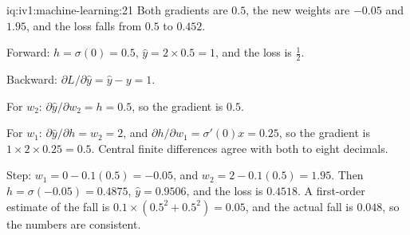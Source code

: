 \begin{solution}{iq:iv1:machine-learning:21}
Both gradients are $0.5$, the new weights are $-0.05$ and $1.95$, and the loss falls from $0.5$ to $0.452$.

Forward: $h = \sigma(0) = 0.5$, $\hat{y} = 2 \times 0.5 = 1$, and the loss is $\frac12$.

Backward: $\partial L/\partial\hat{y} = \hat{y} - y = 1$.

For $w_2$: $\partial\hat{y}/\partial w_2 = h = 0.5$, so the gradient is $0.5$.

For $w_1$: $\partial\hat{y}/\partial h = w_2 = 2$, and $\partial h/\partial w_1 = \sigma'(0)x = 0.25$, so the gradient is $1 \times 2 \times 0.25 = 0.5$. Central finite differences agree with both to eight decimals.

Step: $w_1 = 0 - 0.1(0.5) = -0.05$, and $w_2 = 2 - 0.1(0.5) = 1.95$. Then $h = \sigma(-0.05) = 0.4875$, $\hat{y} = 0.9506$, and the loss is $0.4518$. A first-order estimate of the fall is $0.1 \times (0.5^2 + 0.5^2) = 0.05$, and the actual fall is $0.048$, so the numbers are consistent.



\end{solution}

